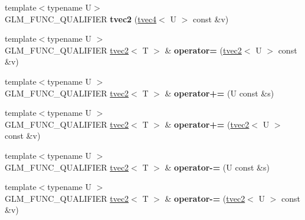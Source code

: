 \begin{DoxyCompactItemize}
\item 
\hypertarget{structglm_1_1detail_1_1tvec2_acd687b5536fe7df9c3b822c01e9529ae}{}{\footnotesize template$<$typename U$>$ }\\G\+L\+M\+\_\+\+F\+U\+N\+C\+\_\+\+Q\+U\+A\+L\+I\+F\+I\+E\+R {\bfseries tvec2} (\hyperlink{structglm_1_1detail_1_1tvec4}{tvec4}$<$ U $>$ const \&v)\label{structglm_1_1detail_1_1tvec2_acd687b5536fe7df9c3b822c01e9529ae}

\item 
\hypertarget{structglm_1_1detail_1_1tvec2_ab18840eb7315fc5ca72a8420ee75d96c}{}{\footnotesize template$<$typename U $>$ }\\G\+L\+M\+\_\+\+F\+U\+N\+C\+\_\+\+Q\+U\+A\+L\+I\+F\+I\+E\+R \hyperlink{structglm_1_1detail_1_1tvec2}{tvec2}$<$ T $>$ \& {\bfseries operator=} (\hyperlink{structglm_1_1detail_1_1tvec2}{tvec2}$<$ U $>$ const \&v)\label{structglm_1_1detail_1_1tvec2_ab18840eb7315fc5ca72a8420ee75d96c}

\item 
\hypertarget{structglm_1_1detail_1_1tvec2_af6a460a51dd11423576307ff14c26800}{}{\footnotesize template$<$typename U $>$ }\\G\+L\+M\+\_\+\+F\+U\+N\+C\+\_\+\+Q\+U\+A\+L\+I\+F\+I\+E\+R \hyperlink{structglm_1_1detail_1_1tvec2}{tvec2}$<$ T $>$ \& {\bfseries operator+=} (U const \&s)\label{structglm_1_1detail_1_1tvec2_af6a460a51dd11423576307ff14c26800}

\item 
\hypertarget{structglm_1_1detail_1_1tvec2_ac76e2fce823e8c359ead7736969bffcf}{}{\footnotesize template$<$typename U $>$ }\\G\+L\+M\+\_\+\+F\+U\+N\+C\+\_\+\+Q\+U\+A\+L\+I\+F\+I\+E\+R \hyperlink{structglm_1_1detail_1_1tvec2}{tvec2}$<$ T $>$ \& {\bfseries operator+=} (\hyperlink{structglm_1_1detail_1_1tvec2}{tvec2}$<$ U $>$ const \&v)\label{structglm_1_1detail_1_1tvec2_ac76e2fce823e8c359ead7736969bffcf}

\item 
\hypertarget{structglm_1_1detail_1_1tvec2_ac3f2caa2ff367338645dd4157e966ba9}{}{\footnotesize template$<$typename U $>$ }\\G\+L\+M\+\_\+\+F\+U\+N\+C\+\_\+\+Q\+U\+A\+L\+I\+F\+I\+E\+R \hyperlink{structglm_1_1detail_1_1tvec2}{tvec2}$<$ T $>$ \& {\bfseries operator-\/=} (U const \&s)\label{structglm_1_1detail_1_1tvec2_ac3f2caa2ff367338645dd4157e966ba9}

\item 
\hypertarget{structglm_1_1detail_1_1tvec2_ad155e9263dad52b003c608f7c5adcaea}{}{\footnotesize template$<$typename U $>$ }\\G\+L\+M\+\_\+\+F\+U\+N\+C\+\_\+\+Q\+U\+A\+L\+I\+F\+I\+E\+R \hyperlink{structglm_1_1detail_1_1tvec2}{tvec2}$<$ T $>$ \& {\bfseries operator-\/=} (\hyperlink{structglm_1_1detail_1_1tvec2}{tvec2}$<$ U $>$ const \&v)\label{structglm_1_1detail_1_1tvec2_ad155e9263dad52b003c608f7c5adcaea}


\end{DoxyCompactItemize}
